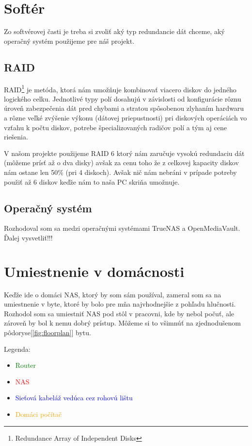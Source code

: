 \documentclass[12pt,oneside,slovak,a4paper]{article}
\begin{document}
\section{Softér}
Zo softvérovej časti je treba si zvoliť aký typ redundancie dát chceme, aký operačný systém použijeme pre náš projekt.

\subsection{RAID}
RAID\footnote{Redundance Array of Independent Disks} je metóda, ktorá nám umožňuje kombinovať viacero diskov do jedného logického celku. Jednotlivé typy polí dosahujú v závislosti od konfigurácie rôznu úroveň zabezpečenia dát pred chybami a stratou spôsobenou zlyhaním hardwaru a rôzne veľké zvýšenie výkonu (dátovej priepustnosti) pri diskových operáciách vo vzťahu k počtu diskov, potrebe špecializovaných radičov polí a tým aj cene riešenia.

V našom projekte použijeme RAID 6 ktorý nám zaručuje vysokú redundaciu dát (môžeme prísť až o dva disky) avšak za cenu toho že z celkovej kapacity diskov nám ostane len 50\% (pri 4 diskoch). Avšak nič nám nebráni v prípade potreby použiť až 6 diskov keďže nám to naša PC skriňa umožnuje.

\subsection{Operačný systém}
Rozhodoval som sa medzi operačnými systémami TrueNAS a OpenMediaVault. Ďalej vysvetliť!!!

\section{Umiestnenie v domácnosti}
Keďže ide o domáci NAS, ktorý by som sám používal, zameral som sa na umiestnenie v byte, ktoré by bolo pre mňa najvhodnejšie z pohľadu hlučnosti. Rozhodol som sa umiestniť NAS pod stôl v pracovni, kde by nebol počuť, ale zároveň by bol k nemu dobrý prístup. Môžeme si to všimnúť na zjednodušenom pôdoryse[\ref{fig:floorplan}] bytu.

Legenda:
\begin{spacing}{1.0}
\begin{itemize}
	\item \textcolor{green}{Router}
	\item \textcolor{red}{NAS}
	\item \textcolor{blue}{Sieťová kabeláž vedúca cez rohovú lištu}
	\item \textcolor{orange}{Domáci počítač}
\end{itemize}
\end{spacing}
\end{document}
